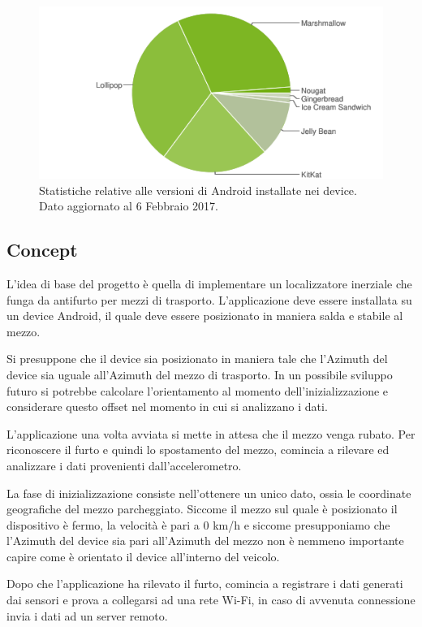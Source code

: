 \documentclass[12pt,a4paper,openright,twoside]{report}
\begin{document}
\begin{figure}[h!]
\centering 
\includegraphics[scale=0.6]{fig11} 
\caption{Statistiche relative alle versioni di Android installate nei device. Dato aggiornato al 6 Febbraio 2017.} 
\end{figure}

\subsection{Concept}
L'idea di base del progetto è quella di implementare un localizzatore inerziale che funga da antifurto per mezzi di trasporto. L'applicazione deve essere installata su un device Android, il quale deve essere posizionato in maniera salda e stabile al mezzo.

Si presuppone che il device sia posizionato in maniera tale che l'Azimuth del device sia uguale all'Azimuth del mezzo di trasporto. In un possibile sviluppo futuro si potrebbe calcolare l'orientamento al momento dell'inizializzazione e considerare questo offset nel momento in cui si analizzano i dati.


L'applicazione una volta avviata si mette in attesa che il mezzo venga rubato. Per riconoscere il furto e quindi lo spostamento del mezzo, comincia a rilevare ed analizzare i dati provenienti dall'accelerometro.

La fase di inizializzazione consiste nell'ottenere un unico dato, ossia le coordinate geografiche del mezzo parcheggiato. Siccome il mezzo sul quale è posizionato il dispositivo è fermo, la velocità è pari a 0 km/h e siccome presupponiamo che l'Azimuth del device sia pari all'Azimuth del mezzo non è nemmeno importante capire come è orientato il device all'interno del veicolo.


Dopo che l'applicazione ha rilevato il furto, comincia a registrare i dati generati dai sensori e prova a collegarsi ad una rete Wi-Fi, in caso di avvenuta connessione invia i dati ad un server remoto.
\newpage
\end{document}
